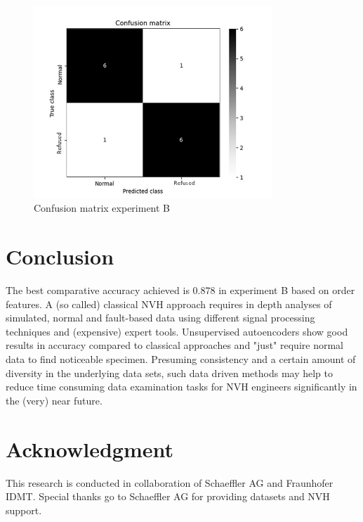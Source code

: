 \documentclass[a4paper, 10pt, twocolumn]{article}
\begin{document}
\begin{figure}[hbt]
\begin{center}
\includegraphics[width=9cm]{conf_matrix_order.png}
\end{center}
\caption{Confusion matrix experiment B}
\label{fig:conf_matrix_expb}
\end{figure}
\FloatBarrier
\section*{Conclusion}
\label{sec:Conclusion}
The best comparative accuracy achieved is 0.878 in experiment B based on order features. A (so called) classical NVH approach requires in depth analyses of simulated, normal and fault-based data using different signal processing techniques and (expensive) expert tools. Unsupervised autoencoders show good results in accuracy compared to classical approaches and "just" require normal data to ﬁnd noticeable specimen.
Presuming consistency and a certain amount of diversity in the underlying data sets, such data driven methods may help to reduce time consuming data examination tasks for NVH engineers signiﬁcantly in the (very) near future.    



\section*{Acknowledgment}
\label{sec:Acknowledgment}
This research is conducted in collaboration of Schaeffler AG and Fraunhofer IDMT. Special thanks go to Schaeffler AG for providing datasets and NVH support.  
\end{document}
